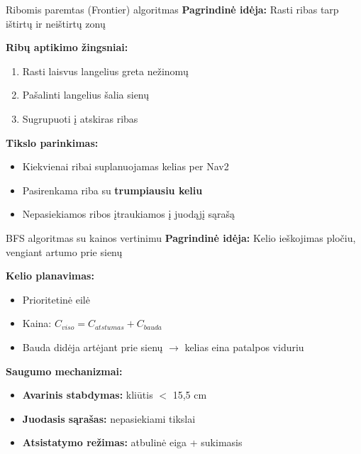 \documentclass[12pt]{beamer}
\begin{document}
\begin{frame}{Ribomis paremtas (Frontier) algoritmas}
    \textbf{Pagrindinė idėja:} Rasti ribas tarp ištirtų ir neištirtų zonų
    
    \vspace{0.3cm}
    \textbf{Ribų aptikimo žingsniai:}
    \begin{enumerate}
        \item Rasti laisvus langelius greta nežinomų 
        \item Pašalinti langelius šalia sienų
        \item Sugrupuoti į atskiras ribas
    \end{enumerate}
    
    \vspace{0.3cm}
    \textbf{Tikslo parinkimas:}
    \begin{itemize}
        \item Kiekvienai ribai suplanuojamas kelias per Nav2
        \item Pasirenkama riba su \textbf{trumpiausiu keliu}
        \item Nepasiekiamos ribos įtraukiamos į juodąjį sąrašą
    \end{itemize}
\end{frame}

\begin{frame}{BFS algoritmas su kainos vertinimu}
    \textbf{Pagrindinė idėja:} Kelio ieškojimas pločiu, vengiant artumo prie sienų
    
    \vspace{0.3cm}
    \textbf{Kelio planavimas:}
    \begin{itemize}
        \item Prioritetinė eilė
        \item Kaina: $C_{viso} = C_{atstumas} + C_{bauda}$
        \item Bauda didėja artėjant prie sienų $\rightarrow$ kelias eina patalpos viduriu
    \end{itemize}
    
    \vspace{0.3cm}
    \textbf{Saugumo mechanizmai:}
    \begin{itemize}
        \item \textbf{Avarinis stabdymas:} kliūtis $<$ 15,5 cm
        \item \textbf{Juodasis sąrašas:} nepasiekiami tikslai
        \item \textbf{Atsistatymo režimas:} atbulinė eiga + sukimasis
    \end{itemize}
\end{frame}
\end{document}
